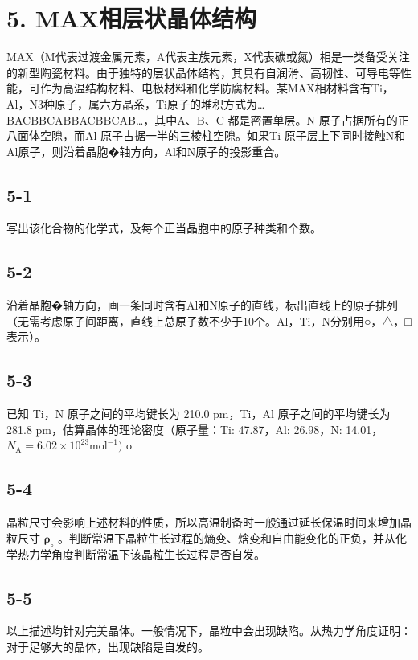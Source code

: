 \section*{5. MAX相层状晶体结构}
MAX（M代表过渡⾦属元素，A代表主族元素，X代表碳或氮）相是⼀类备受关注的新型陶瓷材料。由于独特的层状晶体结构，其具有⾃润滑、⾼韧性、可导电等性能，可作为⾼温结构材料、电极材料和化学防腐材料。某MAX相材料含有Ti，Al，N3种原⼦，属六⽅晶系，Ti原⼦的堆积⽅式为…BACBBCABBACBBCAB…，其中A、B、C 都是密置单层。N 原⼦占据所有的正⼋⾯体空隙，⽽Al 原⼦占据⼀半的三棱柱空隙。如果Ti 原⼦层上下同时接触N和Al原⼦，则沿着晶胞�轴⽅向，Al和N原⼦的投影重合。

\subsection*{5-1}
写出该化合物的化学式，及每个正当晶胞中的原⼦种类和个数。

\subsection*{5-2}
沿着晶胞�轴⽅向，画⼀条同时含有Al和N原⼦的直线，标出直线上的原⼦排列（⽆需考虑原⼦间距离，直线上总原⼦数不少于10个。Al，Ti，N分别⽤○，△，□表⽰）。

\subsection*{5-3}
已知 Ti，N 原⼦之间的平均键⻓为 210.0 pm，Ti，Al 原⼦之间的平均键⻓为 281.8 pm，估算晶体的理论密度（原⼦量：Ti: 47.87，Al: 26.98，N: 14.01， $N _ { \mathrm { A } } = 6 . 0 2 { \times } 1 0 ^ { 2 3 } \mathrm { m o l ^ { - 1 } } )$ o

\subsection*{5-4}
晶粒尺⼨会影响上述材料的性质，所以⾼温制备时⼀般通过延⻓保温时间来增加晶粒尺⼨ $\mathbf { \rho } _ { \circ }$ 。判断常温下晶粒⽣⻓过程的熵变、焓变和⾃由能变化的正负，并从化学热⼒学⻆度判断常温下该晶粒⽣⻓过程是否⾃发。

\subsection*{5-5}
以上描述均针对完美晶体。⼀般情况下，晶粒中会出现缺陷。从热⼒学⻆度证明：对于⾜够⼤的晶体，出现缺陷是⾃发的。

